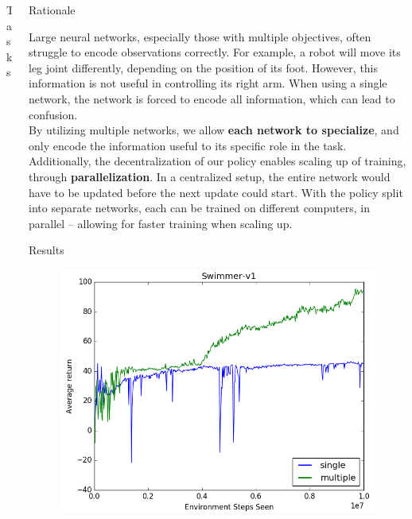 \documentclass[final]{beamer}
\newlength{\onecolwid}
\newlength{\twocolwid}
\begin{document}
\begin{frame}[t]
\begin{columns}[t]
\begin{column}{\twocolwid}
\begin{columns}[t,totalwidth=\twocolwid]
\begin{column}{\onecolwid}
\begin{block}{Tasks}
\end{block}


\end{column} %



\begin{column}{\onecolwid} %

\vspace{-1.3cm}

\begin{block}{Rationale}

Large neural networks, especially those with multiple objectives, often struggle to encode observations correctly. For example, a robot will move its leg joint differently, depending on the position of its foot. However, this information is not useful in controlling its right arm. When using a single network, the network is forced to encode all information, which can lead to confusion.
\\[12pt]
By utilizing multiple networks, we allow \textbf{each network to specialize}, and only encode the information useful to its specific role in the task.
\\[12pt]
Additionally, the decentralization of our policy enables scaling up of training, through \textbf{parallelization}. In a centralized setup, the entire network would have to be updated before the next update could start. With the policy split into separate networks, each can be trained on different computers, in parallel -- allowing for faster training when scaling up.

\end{block}


\begin{block}{Results}

    \begin{figure}
    \includegraphics[width=0.5\linewidth]{swimmer.png}
    \end{figure}


\end{block}
\end{column}
\end{columns}
\end{column}
\end{columns}
\end{frame}
\end{document}
